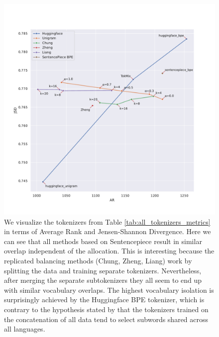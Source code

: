 \begin{figure}[H]
    \centering
    \includegraphics[width=\textwidth]{figures/all_tokenizers_AR_vs_JSD.pdf}
    \caption{We visualize the tokenizers from Table \ref{tab:all_tokenizers_metrics} in terms of Average Rank and Jensen-Shannon Divergence. Here we can see that all methods based on Sentencepiece result in similar overlap independent of the allocation. This is interesting because the replicated balancing methods (Chung, Zheng, Liang) work by splitting the data and training separate tokenizers. Nevertheless, after merging the separate subtokenizers they all seem to end up with similar vocabulary overlaps. The highest vocabulary isolation is surprisingly achieved by the Huggingface BPE tokenizer, which is contrary to the hypothesis stated by \citet{chung_improving_2020,zheng_allocating_2021} that the tokenizers trained on the concatenation of all data tend to select subwords shared across all languages.}
    \label{fig:all_tokenizers_AR_vs_JSD}
\end{figure}

